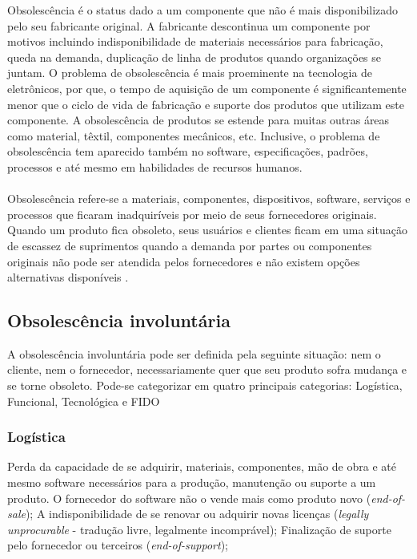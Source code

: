 Obsolescência é o status dado a um componente que não é mais disponibilizado pelo seu fabricante original. A fabricante descontinua um componente por motivos incluindo indisponibilidade de materiais necessários para fabricação, queda na demanda, duplicação de linha de produtos quando organizações se juntam. O problema de obsolescência é mais proeminente na tecnologia de eletrônicos, por que, o tempo de aquisição de um componente é significantemente menor que o ciclo de vida de fabricação e suporte dos produtos que utilizam este componente. A obsolescência de produtos se estende para muitas outras áreas como material, têxtil, componentes mecânicos, etc. Inclusive, o problema de obsolescência tem aparecido também no software, especificações, padrões, processos e até mesmo em habilidades de recursos humanos.
\\\\
Obsolescência refere-se a materiais, componentes, dispositivos, software, serviços e processos que ficaram inadquiríveis por meio de seus fornecedores originais. Quando um produto fica obsoleto, seus usuários e clientes ficam em uma situação de escassez de suprimentos quando a demanda por partes ou componentes originais não pode ser atendida pelos fornecedores e não existem opções alternativas disponíveis \cite{COG2005}.

\subsection{\esp Obsolescência involuntária}

A obsolescência involuntária pode ser definida pela seguinte situação: nem o cliente, nem o fornecedor, necessariamente quer que seu produto sofra mudança e se torne obsoleto. Pode-se categorizar em quatro principais categorias: Logística, Funcional, Tecnológica e FIDO \cite{sandborn2012}

\subsubsection{\esp Logística}

Perda da capacidade de se adquirir, materiais, componentes, mão de obra e até mesmo software necessários para a produção, manutenção ou suporte a um produto.
O fornecedor do software não o vende mais como produto novo (\textit{end-of-sale});
A indisponibilidade de se renovar ou adquirir novas licenças (\textit{legally unprocurable} - tradução livre, legalmente incomprável);
Finalização de suporte pelo fornecedor ou terceiros (\textit{end-of-support});

